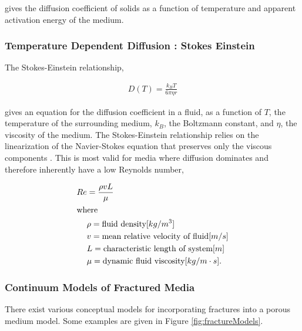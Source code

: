 gives the diffusion coefficient of solids as a function of temperature and
apparent activation energy of the 
medium.

\subsubsection{ Temperature Dependent Diffusion : Stokes Einstein }

The Stokes-Einstein relationship,

\begin{align}
  D(T) = \frac{k_B T}{6\pi \eta r}
\end{align}

gives an equation for the diffusion coefficient in a fluid, as a function of $T$,  
the temperature of the surrounding medium, $k_B$, the Boltzmann constant, and 
$\eta$, the viscosity of the medium.  The Stokes-Einstein relationship relies on 
the linearization of the Navier-Stokes equation that preserves only the viscous 
components \cite{happel_low_1991}. This is most valid for media where diffusion 
dominates and therefore inherently have a low Reynolds number, 

\begin{align}
  Re &= \frac{\rho v L}{\mu}\\
     \intertext{where}
     &\rho = \mbox{fluid density} [kg/m^{3}]\\
     &v = \mbox{mean relative velocity of fluid} [m/s]\\
     &L = \mbox{characteristic length of system} [m]\\
     &\mu = \mbox{dynamic fluid viscosity} [kg/m\cdot s].
\end{align}






\subsubsection{Continuum Models of Fractured Media} 

There exist various conceptual models for incorporating fractures into a porous  
medium model. Some examples are given in Figure \ref{fig:fractureModels}.

